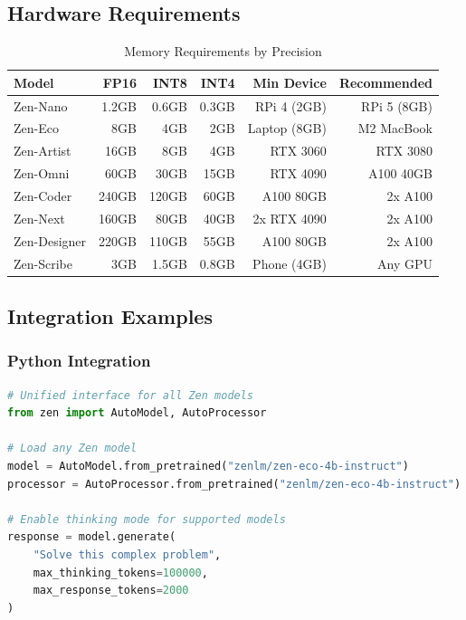 \documentclass[11pt,a4paper]{article}
\begin{document}
\subsection{Hardware Requirements}

\begin{table}[H]
\centering
\footnotesize
\begin{tabular}{lrrrrr}
\toprule
\textbf{Model} & \textbf{FP16} & \textbf{INT8} & \textbf{INT4} & \textbf{Min Device} & \textbf{Recommended} \\
\midrule
Zen-Nano & 1.2GB & 0.6GB & 0.3GB & RPi 4 (2GB) & RPi 5 (8GB) \\
Zen-Eco & 8GB & 4GB & 2GB & Laptop (8GB) & M2 MacBook \\
Zen-Artist & 16GB & 8GB & 4GB & RTX 3060 & RTX 3080 \\
Zen-Omni & 60GB & 30GB & 15GB & RTX 4090 & A100 40GB \\
Zen-Coder & 240GB & 120GB & 60GB & A100 80GB & 2x A100 \\
Zen-Next & 160GB & 80GB & 40GB & 2x RTX 4090 & 2x A100 \\
Zen-Designer & 220GB & 110GB & 55GB & A100 80GB & 2x A100 \\
Zen-Scribe & 3GB & 1.5GB & 0.8GB & Phone (4GB) & Any GPU \\
\bottomrule
\end{tabular}
\caption{Memory Requirements by Precision}
\end{table}

\subsection{Integration Examples}

\subsubsection{Python Integration}
\begin{lstlisting}[language=Python]
# Unified interface for all Zen models
from zen import AutoModel, AutoProcessor

# Load any Zen model
model = AutoModel.from_pretrained("zenlm/zen-eco-4b-instruct")
processor = AutoProcessor.from_pretrained("zenlm/zen-eco-4b-instruct")

# Enable thinking mode for supported models
response = model.generate(
    "Solve this complex problem",
    max_thinking_tokens=100000,
    max_response_tokens=2000
)
\end{lstlisting}
\end{document}
